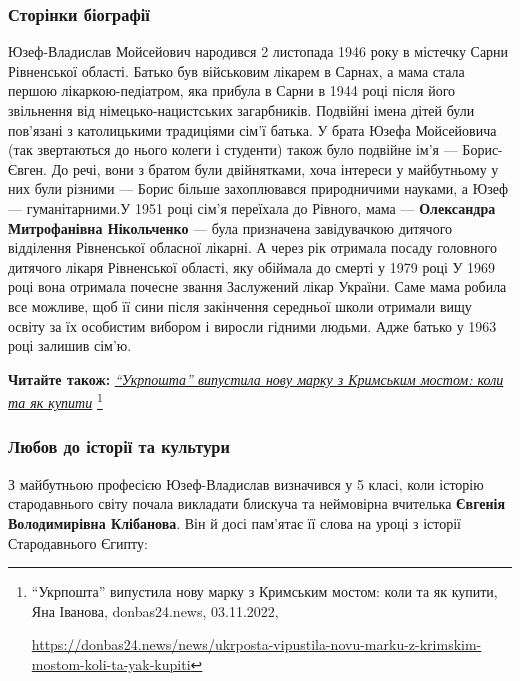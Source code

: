 
\subsubsection{Сторінки біографії}

Юзеф-Владислав Мойсейович народився 2 листопада 1946 року в містечку Сарни
Рівненської області. Батько був військовим лікарем в Сарнах, а мама стала
першою лікаркою-педіатром, яка прибула в Сарни в 1944 році після його
звільнення від німецько-нацистських загарбників. Подвійні імена дітей були
пов’язані з католицькими традиціями сім'ї батька. У брата Юзефа Мойсейовича
(так звертаються до нього колеги і студенти) також було подвійне ім'я —
Борис-Євген. До речі, вони з братом були двійнятками, хоча інтереси у
майбутньому у них були різними — Борис більше захоплювався природничими
науками, а Юзеф — гуманітарними.У 1951 році сім'я переїхала до Рівного, мама —
\textbf{Олександра Митрофанівна Нікольченко} — була призначена завідувачкою дитячого
відділення Рівненської обласної лікарні. А через рік отримала посаду головного
дитячого лікаря Рівненської області, яку обіймала до смерті у 1979 році У 1969
році вона отримала почесне звання Заслужений лікар України. Саме мама робила
все можливе, щоб її сини після закінчення середньої школи отримали вищу освіту
за їх особистим вибором і виросли гідними людьми. Адже батько у 1963 році
залишив сім'ю.

\textbf{Читайте також:} \href{https://donbas24.news/news/ukrposta-vipustila-novu-marku-z-krimskim-mostom-koli-ta-yak-kupiti}{\emph{\enquote{Укрпошта} випустила нову марку з Кримським мостом: коли та як купити}}%
\footnote{\enquote{Укрпошта} випустила нову марку з Кримським мостом: коли та як купити, Яна Іванова, donbas24.news, 03.11.2022, \par%
\url{https://donbas24.news/news/ukrposta-vipustila-novu-marku-z-krimskim-mostom-koli-ta-yak-kupiti}%
}


\subsubsection{Любов до історії та культури}

З майбутньою професією Юзеф-Владислав визначився у 5 класі, коли історію
стародавнього світу почала викладати блискуча та неймовірна вчителька \textbf{Євгенія
Володимирівна Клібанова}. Він й досі пам'ятає її слова на уроці з історії
Стародавнього Єгипту: 

